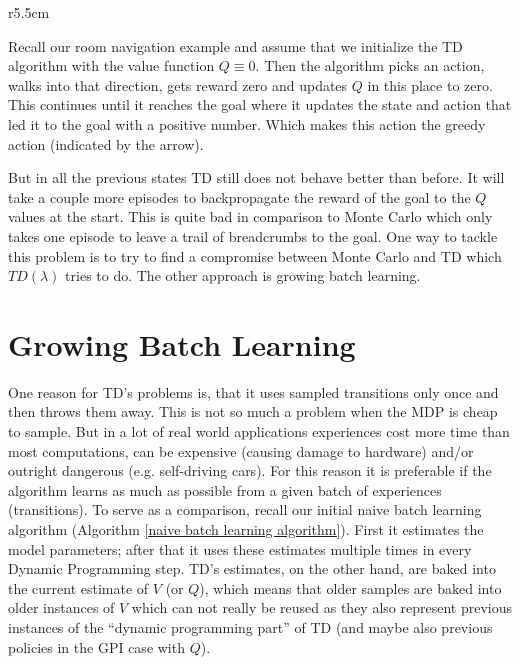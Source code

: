 \begin{wrapfigure}{r}{5.5cm}
	\begin{center}
	\end{center}
\end{wrapfigure}

 Recall our room navigation example and assume that we initialize the TD algorithm with the value function \({Q\equiv 0}\). Then the algorithm picks an action, walks into that direction, gets reward zero and updates \(Q\) in this place to zero. This continues until it reaches the goal where it updates the state and action that led it to the goal with a positive number. Which makes this action the greedy action (indicated by the arrow). 
 
 But in all the previous states TD still does not behave better than before. It will take a couple more episodes to backpropagate the reward of the goal to the \(Q\) values at the start. This is quite bad in comparison to Monte Carlo which only takes one episode to leave a trail of breadcrumbs to the goal. One way to tackle this problem is to try to find a compromise between Monte Carlo and TD which \(TD(\lambda)\) tries to do. The other approach is growing batch learning. 


\section{Growing Batch Learning}\label{growing batch learning} 
One reason for TD's problems is, that it uses sampled transitions only once and then throws them away. This is not so much a problem when the MDP is cheap to sample. But in a lot of real world applications experiences cost more time than most computations, can be expensive (causing damage to hardware) and/or outright dangerous (e.g. self-driving cars). For this reason it is preferable if the algorithm learns as much as possible from a given batch of experiences (transitions). To serve as a comparison, recall our initial naive batch learning algorithm (Algorithm \ref{naive batch learning algorithm}). First it estimates the model parameters; after that it uses these estimates multiple times in every Dynamic Programming step. TD's estimates, on the other hand, are baked into the current estimate of \(V\) (or \(Q\)), which means that older samples are baked into older instances of \(V\) which can not really be reused as they also represent previous instances of the ``dynamic programming part'' of TD (and maybe also previous policies in the GPI case with \(Q\)).

